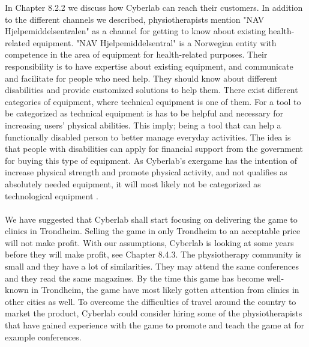 In Chapter 8.2.2 we discuss how Cyberlab can reach their customers. In addition to the different channels we described, physiotherapists mention "NAV Hjelpemiddelsentralen" as a channel for getting to know about existing health-related equipment. "NAV Hjelpemiddelsentral" is a Norwegian entity with competence in the area of equipment for health-related purposes. Their responsibility is to have expertise about existing equipment, and communicate and facilitate for people who need help. They should know about different disabilities and provide customized solutions to help them. There exist different categories of equipment, where technical equipment is one of them. For a tool to be categorized as technical equipment is has to be helpful and necessary for increasing users' physical abilities. This imply; being a tool that can help a functionally disabled person to better manage everyday activities. The idea is that people with disabilities can apply for financial support from the government for buying this type of equipment. As Cyberlab’s exergame has the intention of increase physical strength and promote physical activity, and not qualifies as absolutely needed equipment, it will most likely not be categorized as technological equipment \cite{navhjelpemiddel} \cite{navhjelpemiddelsentralen}.  \\ \\
We have suggested that Cyberlab shall start focusing on delivering the game to clinics in Trondheim. Selling the game in only Trondheim to an acceptable price will not make profit. With our assumptions, Cyberlab is looking at some years before they will make profit, see Chapter 8.4.3. The physiotherapy community is small and they have a lot of similarities. They may attend the same conferences and they read the same magazines. By the time this game has become well-known in Trondheim, the game have most likely gotten attention from clinics in other cities as well. To overcome the difficulties of travel around the country to market the product, Cyberlab could consider hiring some of the physiotherapists that have gained experience with the game to promote and teach the game at for example conferences.\\ \\
